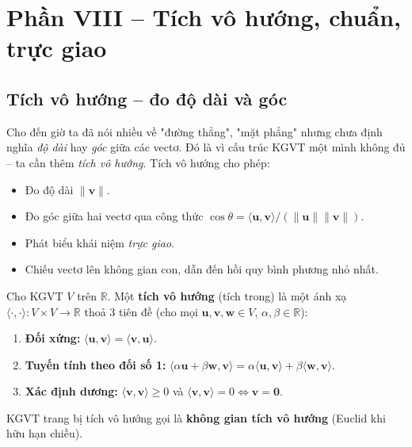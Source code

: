 \documentclass[12pt,a4paper]{article}
\begin{document}
\newpage

\section{Phần VIII -- Tích vô hướng, chuẩn, trực giao}

\subsection{Tích vô hướng -- đo độ dài và góc}

\begin{dongco}
Cho đến giờ ta đã nói nhiều về "đường thẳng", "mặt phẳng" nhưng chưa định nghĩa \emph{độ dài} hay \emph{góc} giữa các vectơ. Đó là vì cấu trúc KGVT một mình không đủ -- ta cần thêm \emph{tích vô hướng}. Tích vô hướng cho phép:
\begin{itemize}
  \item Đo độ dài $\|\mathbf{v}\|$.
  \item Đo góc giữa hai vectơ qua công thức $\cos\theta = \langle \mathbf{u}, \mathbf{v}\rangle / (\|\mathbf{u}\|\|\mathbf{v}\|)$.
  \item Phát biểu khái niệm \emph{trực giao}.
  \item Chiếu vectơ lên không gian con, dẫn đến hồi quy bình phương nhỏ nhất.
\end{itemize}
\end{dongco}

\begin{dinhnghia}
  Cho KGVT $V$ trên $\mathbb{R}$. Một \textbf{tích vô hướng} (tích trong) là một ánh xạ $\langle \cdot, \cdot \rangle : V \times V \to \mathbb{R}$ thoả 3 tiên đề (cho mọi $\mathbf{u},\mathbf{v},\mathbf{w} \in V$, $\alpha, \beta \in \mathbb{R}$):
  \begin{enumerate}
    \item \textbf{Đối xứng:} $\langle \mathbf{u}, \mathbf{v}\rangle = \langle \mathbf{v}, \mathbf{u}\rangle$.
    \item \textbf{Tuyến tính theo đối số 1:} $\langle \alpha\mathbf{u} + \beta\mathbf{w}, \mathbf{v}\rangle = \alpha\langle \mathbf{u}, \mathbf{v}\rangle + \beta\langle \mathbf{w}, \mathbf{v}\rangle$.
    \item \textbf{Xác định dương:} $\langle \mathbf{v}, \mathbf{v}\rangle \ge 0$ và $\langle \mathbf{v}, \mathbf{v}\rangle = 0 \Leftrightarrow \mathbf{v} = \mathbf{0}$.
  \end{enumerate}
  KGVT trang bị tích vô hướng gọi là \textbf{không gian tích vô hướng} (Euclid khi hữu hạn chiều).
\end{dinhnghia}
\end{document}
